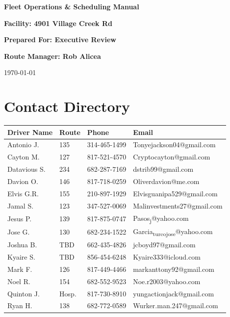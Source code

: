 \documentclass[11pt]{article}
\author{termux}
\date{\today}
\title{}
\begin{document}
\begin{titlepage}
    \centering
    \vspace*{4cm}
    {\Huge \color{fedexpurple} \textbf{Fleet Operations \& Scheduling Manual}\par}
    \vspace{1.5cm}
    {\huge \color{fedexorange} \textbf{Facility: 4901 Village Creek Rd}\par}
    \vspace{3cm}
    {\Large \textbf{Prepared For: Executive Review}\par}
    \vspace{0.75cm}
    {\Large \textbf{Route Manager: Rob Alicea}\par}
    \vfill
    {\large \today\par}
\end{titlepage}

\newpage
\tableofcontents
\newpage
\section{Contact Directory}
\label{sec:orge3d5907}

\begin{center}
\begin{tabular}{l l l l}
\toprule
Driver Name & Route & Phone & Email\\
\midrule
Antonio J. & 135 & 314-465-1499 & Tonyejackson04@gmail.com\\
Cayton M. & 127 & 817-521-4570 & Cryptocayton@gmail.com\\
Datavious S. & 234 & 682-287-7169 & dstrib99@gmail.com\\
Davion O. & 146 & 817-718-0259 & Oliverdavion@me.com\\
Elvis G.R. & 155 & 210-897-1929 & Elvisguanipa529@gmail.com\\
Jamal S. & 123 & 347-527-0069 & Malinvestments27@gmail.com\\
Jesus P. & 139 & 817-875-0747 & Pasos\textsubscript{j}@yahoo.com\\
Jose G. & 130 & 682-234-1522 & Garcia\textsubscript{turco}\textsubscript{jose}@yahoo.com\\
Joshua B. & TBD & 662-435-4826 & jcboyd97@gmail.com\\
Kyaire S. & TBD & 856-454-6248 & Kyaire333@icloud.com\\
Mark F. & 126 & 817-449-4466 & markanttony92@gmail.com\\
Noel R. & 154 & 682-552-9523 & Noe.r2003@yahoo.com\\
Quinton J. & Hosp. & 817-730-8910 & yungactionjack@gmail.com\\
Ryan H. & 138 & 682-772-0589 & Wurker.man.247@gmail.com\\
\bottomrule
\end{tabular}
\end{center}
\end{document}
